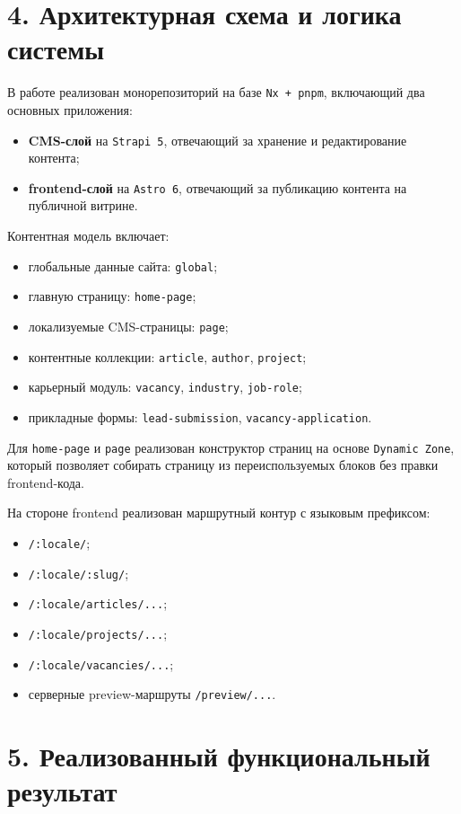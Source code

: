 \documentclass[12pt,a4paper]{article}
\begin{document}
\section*{4. Архитектурная схема и логика системы}

В работе реализован монорепозиторий на базе \texttt{Nx + pnpm}, включающий два основных
приложения:
\begin{itemize}
  \item \textbf{CMS-слой} на \texttt{Strapi 5}, отвечающий за хранение и редактирование
  контента;
  \item \textbf{frontend-слой} на \texttt{Astro 6}, отвечающий за публикацию контента на
  публичной витрине.
\end{itemize}

Контентная модель включает:
\begin{itemize}
  \item глобальные данные сайта: \texttt{global};
  \item главную страницу: \texttt{home-page};
  \item локализуемые CMS-страницы: \texttt{page};
  \item контентные коллекции: \texttt{article}, \texttt{author}, \texttt{project};
  \item карьерный модуль: \texttt{vacancy}, \texttt{industry}, \texttt{job-role};
  \item прикладные формы: \texttt{lead-submission}, \texttt{vacancy-application}.
\end{itemize}

Для \texttt{home-page} и \texttt{page} реализован конструктор страниц на основе
\texttt{Dynamic Zone}, который позволяет собирать страницу из переиспользуемых блоков без
правки frontend-кода.

На стороне frontend реализован маршрутный контур с языковым префиксом:
\begin{itemize}
  \item \texttt{/:locale/};
  \item \texttt{/:locale/:slug/};
  \item \texttt{/:locale/articles/...};
  \item \texttt{/:locale/projects/...};
  \item \texttt{/:locale/vacancies/...};
  \item серверные preview-маршруты \texttt{/preview/...}.
\end{itemize}

\section*{5. Реализованный функциональный результат}
\end{document}
